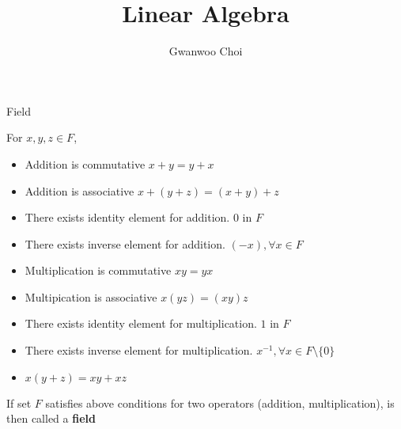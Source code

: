 \documentclass[8pt]{beamer}
\title{Linear Algebra}
\author{Gwanwoo Choi}
\newcommand{\tb}[1]{\textbf{#1}}
\begin{document}
\begin{frame}
    \titlepage
\end{frame}





\begin{frame}{Field}
  \begin{definition}[Field]\label{def:field}
    For $x, y, z \in F$,
    \begin{itemize}
      \item Addition is commutative $ x+ y = y + x$
      \item Addition is associative $x + (y + z) = (x+y) + z$
      \item There exists identity element for addition. $0$ in $F$
      \item There exists inverse element for addition. $(-x), \forall x \in F$
      \item Multiplication is commutative $xy = yx$
      \item Multipication is associative $x(yz) = (xy)z$
      \item There exists identity element for multiplication. $1$ in $F$
      \item There exists inverse element for multiplication. $x^{-1}, \forall x \in F \setminus \{0\}$
      \item $x(y+z) = xy + xz$
    \end{itemize}
    If set $F$ satisfies above conditions for two operators (addition, multiplication), is then called a \tb{field}
  \end{definition}
\end{frame}
\end{document}
